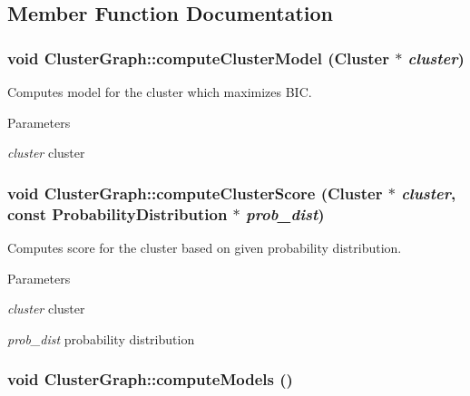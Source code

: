 \subsection{Member Function Documentation}
\hypertarget{classClusterGraph_a369ef26fd84e8c9d684ad7641da7e701}{
\subsubsection[{computeClusterModel}]{\setlength{\rightskip}{0pt plus 5cm}void ClusterGraph::computeClusterModel ({\bf Cluster} $\ast$ {\em cluster})}}
\label{classClusterGraph_a369ef26fd84e8c9d684ad7641da7e701}


Computes model for the cluster which maximizes BIC. 
\begin{DoxyParams}{Parameters}
\item[{\em cluster}]cluster \end{DoxyParams}
\hypertarget{classClusterGraph_ad32a8fd8ff701eda0abd94f388d16047}{
\subsubsection[{computeClusterScore}]{\setlength{\rightskip}{0pt plus 5cm}void ClusterGraph::computeClusterScore ({\bf Cluster} $\ast$ {\em cluster}, \/  const {\bf ProbabilityDistribution} $\ast$ {\em prob\_\-dist})}}
\label{classClusterGraph_ad32a8fd8ff701eda0abd94f388d16047}


Computes score for the cluster based on given probability distribution. 
\begin{DoxyParams}{Parameters}
\item[{\em cluster}]cluster \item[{\em prob\_\-dist}]probability distribution \end{DoxyParams}
\hypertarget{classClusterGraph_a8c465a727344b22c07876cac28c9fe4c}{
\subsubsection[{computeModels}]{\setlength{\rightskip}{0pt plus 5cm}void ClusterGraph::computeModels ()}}
\label{classClusterGraph_a8c465a727344b22c07876cac28c9fe4c}


